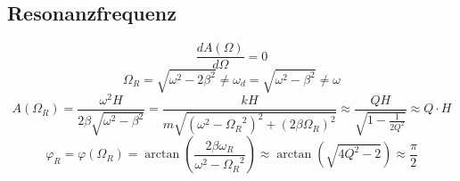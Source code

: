 \subsection{Resonanzfrequenz}
\[ \boxed{\frac{d A(\Omega)}{d\Omega} = 0} \]
\[ \boxed{\Omega_R = \sqrt{\omega^2 - 2\beta^2} \neq \omega_d 
= \sqrt{\omega^2 - \beta^2} \neq \omega} \]
\[ \boxed{A(\Omega_R) = \frac{\omega^2 H}{2 \beta \sqrt{\omega^2 - \beta^2}} 
= \frac{k H}{m \sqrt{(\omega^2 - {\Omega_R}^2)^2 + (2\beta\Omega_R)^2}} 
\approx \frac{Q H}{\sqrt{1 - \frac{1}{2 Q^2}}} \approx Q \cdot H} \]
\[ \boxed{\varphi_R = \varphi(\Omega_R) 
= \arctan\left(\frac{2 \beta \omega_R}{\omega^2 - {\Omega_R}^2}\right) 
\approx \arctan\left(\sqrt{4 Q^2 - 2}\right) \approx \frac{\pi}{2}} \]

